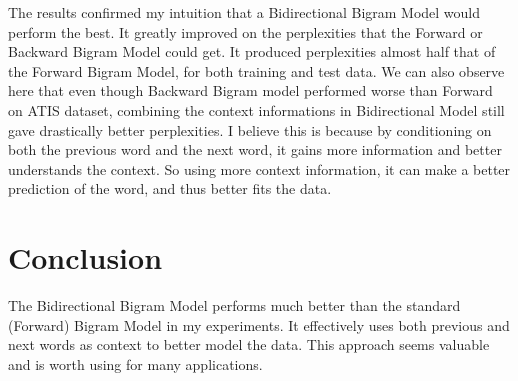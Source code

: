 \documentclass{article}
\begin{document}
The results confirmed my intuition that a Bidirectional Bigram Model would perform the best. It greatly improved on the perplexities that the Forward or Backward Bigram Model could get. It produced perplexities almost half that of the Forward Bigram Model, for both training and test data. We can also observe here that even though Backward Bigram model performed worse than Forward on ATIS dataset, combining the context informations in Bidirectional Model still gave drastically better perplexities. I believe this is because by conditioning on both the previous word and the next word, it gains more information and better understands the context. So using more context information, it can make a better prediction of the word, and thus better fits the data. 
\section{Conclusion}
The Bidirectional Bigram Model performs much better than the standard (Forward) Bigram Model in my experiments. It effectively uses both previous and next words as context to better model the data. This approach seems valuable and is worth using for many applications.
\end{document}
